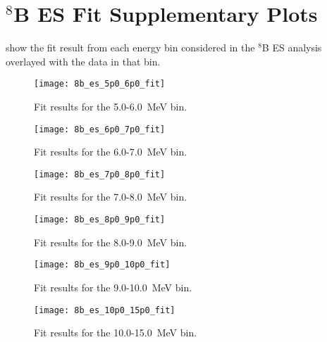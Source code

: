\chapter{{\snop} $^8$B ES Fit Supplementary Plots}
\label{chap:solar_bins}

 show the fit result from each energy bin considered in the {\snop} $^8$B ES analysis overlayed with the data in that bin.

\begin{figure}
\centering
\texttt{[image: 8b\_es\_5p0\_6p0\_fit]}
\caption{\label{fig:56}Fit results for the 5.0-6.0~MeV bin.}
\end{figure}

\begin{figure}
\centering
\texttt{[image: 8b\_es\_6p0\_7p0\_fit]}
\caption{\label{fig:67}Fit results for the 6.0-7.0~MeV bin.}
\end{figure}

\begin{figure}
\centering
\texttt{[image: 8b\_es\_7p0\_8p0\_fit]}
\caption{\label{fig:78}Fit results for the 7.0-8.0~MeV bin.}
\end{figure}

\begin{figure}
\centering
\texttt{[image: 8b\_es\_8p0\_9p0\_fit]}
\caption{\label{fig:89}Fit results for the 8.0-9.0~MeV bin.}
\end{figure}

\begin{figure}
\centering
\texttt{[image: 8b\_es\_9p0\_10p0\_fit]}
\caption{\label{fig:910}Fit results for the 9.0-10.0~MeV bin.}
\end{figure}

\begin{figure}
\centering
\texttt{[image: 8b\_es\_10p0\_15p0\_fit]}
\caption{\label{fig:1015}Fit results for the 10.0-15.0~MeV bin.}
\end{figure}


\clearpage
